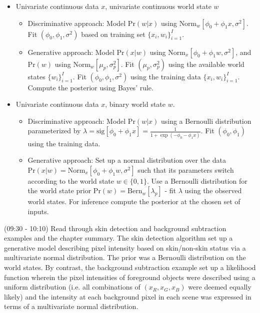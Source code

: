 \documentclass[idxtotoc,hyperref,openany]{labbook} %
\begin{document}
\begin{itemize}
\item Univariate continuous data $x$, univariate continuous world state $w$
	\begin{itemize}
		\item Discriminative approach: Model $\text{Pr}(w|x)$ using $\text{Norm}_{w}[\phi_0 + \phi_1 x, \sigma^2]$. Fit $(\phi_0, \phi_1, \sigma^2)$ based on training set $\{x_i, w_i\}_{i = 1}^I$.
		\item Generative approach: Model $\text{Pr}(x|w)$ using $\text{Norm}_{x}[\phi_0 + \phi_1 w, \sigma^2]$, and $\text{Pr}(w)$  using $\text{Norm}_w [\mu_p, \sigma_p^2]$. Fit $(\mu_p, \sigma_p^2)$ using the available world states $\{w_i\}_{i = 1}^I$. Fit $(\phi_0, \phi_1, \sigma^2)$ using the training data $\{x_i, w_i\}_{i = 1}^I$. Compute the posterior using Bayes' rule. 
	\end{itemize}
\item Univariate continuous data $x$, binary world state $w$.
	\begin{itemize}
		\item Discriminative approach: Model $\text{Pr}(w|x)$ using a Bernoulli distribution parameterized by $\lambda = \text{sig}[\phi_0 + \phi_1 x] = \frac{1}{1 + \exp(-\phi_0 - \phi_1 x)}$. Fit $(\phi_0, \phi_1)$ using the training data.
		\item Generative approach: Set up a normal distribution over the data $\text{Pr}(x|w) = \text{Norm}_x[\phi_0 + \phi_1 w, \sigma^2]$ such that its parameters switch according to the world state $w \in \{0, 1\}$. Use a Bernoulli distribution for the world state prior $\text{Pr}(w) = \text{Bern}_w [\lambda_p]$ - fit $\lambda$ using the observed world states. For inference compute the posterior at the chosen set of inputs.
	\end{itemize}
\end{itemize}

(09:30 - 10:10) Read through skin detection and background subtraction examples and the chapter summary. The skin detection algorithm set up a generative model describing pixel intensity based on skin/non-skin status via a multivariate normal distribution. The prior was a Bernoulli distribution on the world states. By contrast, the background subtraction example set up a likelihood function wherein the pixel intensities of foreground objects were described using a uniform distribution (i.e. all combinations of $(x_R, x_G, x_B)$ were deemed equally likely) and the intensity at each background pixel  in each scene was expressed in terms of a multivariate normal distribution.
\end{document}
